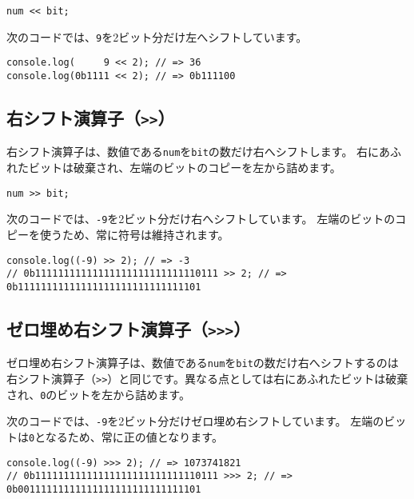 \begin{lstlisting}
num << bit;
\end{lstlisting}

次のコードでは、\texttt{9}を2ビット分だけ左へシフトしています。

\begin{lstlisting}
console.log(     9 << 2); // => 36
console.log(0b1111 << 2); // => 0b111100
\end{lstlisting}

\hypertarget{right-shift}{%
\subsection{\texorpdfstring{右シフト演算子（\texttt{\textgreater{}\textgreater{}}）}{右シフト演算子（\textgreater{}\textgreater{}）}}\label{right-shift}}

右シフト演算子は、数値である\texttt{num}を\texttt{bit}の数だけ右へシフトします。
右にあふれたビットは破棄され、左端のビットのコピーを左から詰めます。

\begin{lstlisting}
num >> bit;
\end{lstlisting}

次のコードでは、\texttt{-9}を2ビット分だけ右へシフトしています。
左端のビットのコピーを使うため、常に符号は維持されます。

\begin{lstlisting}
console.log((-9) >> 2); // => -3
// 0b11111111111111111111111111110111 >> 2; // => 0b11111111111111111111111111111101
\end{lstlisting}

\hypertarget{fill-zero-right-shift}{%
\subsection{\texorpdfstring{ゼロ埋め右シフト演算子（\texttt{\textgreater{}\textgreater{}\textgreater{}}）}{ゼロ埋め右シフト演算子（\textgreater{}\textgreater{}\textgreater{}）}}\label{fill-zero-right-shift}}

ゼロ埋め右シフト演算子は、数値である\texttt{num}を\texttt{bit}の数だけ右へシフトするのは右シフト演算子（\texttt{>>}）と同じです。異なる点としては右にあふれたビットは破棄され、\texttt{0}のビットを左から詰めます。

次のコードでは、\texttt{-9}を2ビット分だけゼロ埋め右シフトしています。
左端のビットは\texttt{0}となるため、常に正の値となります。

\begin{lstlisting}
console.log((-9) >>> 2); // => 1073741821
// 0b11111111111111111111111111110111 >>> 2; // => 0b00111111111111111111111111111101
\end{lstlisting}

